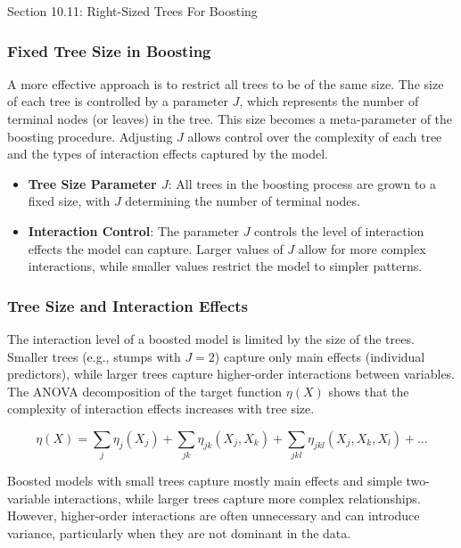 \begin{notes}{Section 10.11: Right-Sized Trees For Boosting}
    \subsubsection*{Fixed Tree Size in Boosting}
    
    A more effective approach is to restrict all trees to be of the same size. The size of each tree is controlled by a parameter $J$, which represents the number of terminal nodes (or leaves) in the 
    tree. This size becomes a meta-parameter of the boosting procedure. Adjusting $J$ allows control over the complexity of each tree and the types of interaction effects captured by the model.
    
    \begin{highlight}
        \begin{itemize}
            \item \textbf{Tree Size Parameter $J$}: All trees in the boosting process are grown to a fixed size, with $J$ determining the number of terminal nodes.
            \item \textbf{Interaction Control}: The parameter $J$ controls the level of interaction effects the model can capture. Larger values of $J$ allow for more complex interactions, while smaller 
            values restrict the model to simpler patterns.
        \end{itemize}
    \end{highlight}
    
    \subsubsection*{Tree Size and Interaction Effects}
    
    The interaction level of a boosted model is limited by the size of the trees. Smaller trees (e.g., stumps with $J = 2$) capture only main effects (individual predictors), while larger trees capture 
    higher-order interactions between variables. The ANOVA decomposition of the target function $\eta(X)$ shows that the complexity of interaction effects increases with tree size.
    
    \[
    \eta(X) = \sum_j \eta_j(X_j) + \sum_{jk} \eta_{jk}(X_j, X_k) + \sum_{jkl} \eta_{jkl}(X_j, X_k, X_l) + \dots
    \]
    
    Boosted models with small trees capture mostly main effects and simple two-variable interactions, while larger trees capture more complex relationships. However, higher-order interactions are often 
    unnecessary and can introduce variance, particularly when they are not dominant in the data.
    

\end{notes}
